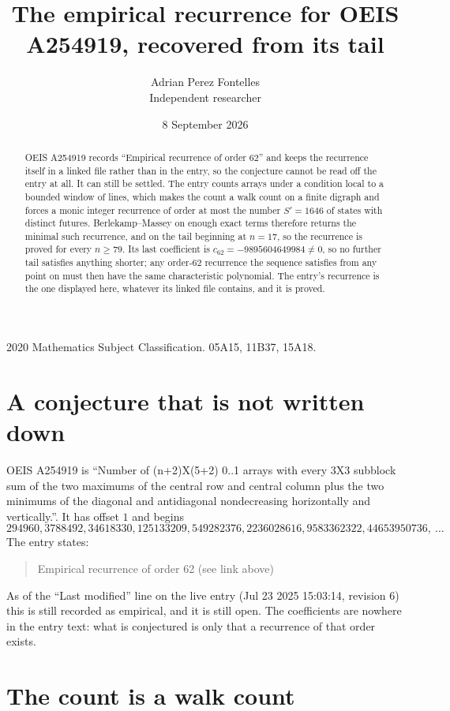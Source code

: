 \documentclass[11pt,a4paper]{article}
\title{The empirical recurrence for OEIS A254919, recovered from its tail}
\author{Adrian Perez Fontelles\\ \small Independent researcher}
\date{8 September 2026}
\theoremstyle{plain}
\theoremstyle{definition}
\begin{document}
\maketitle

\begin{abstract}
OEIS A254919 records ``Empirical recurrence of order $62$'' and keeps the recurrence itself in
a linked file rather than in the entry, so the conjecture cannot be read off the entry at all.
It can still be settled. The entry counts arrays under a condition local to a bounded window of
lines, which makes the count a walk count on a finite digraph and forces a monic integer
recurrence of order at most the number $S'=1646$ of states with distinct futures. Berlekamp--Massey on
enough exact terms therefore returns the minimal such recurrence, and on the tail beginning at $n=17$, so the recurrence is proved for every $n\ge79$.
Its last coefficient is $c_{62}=-9895604649984\neq0$, so no further tail satisfies anything
shorter; any order-$62$ recurrence the sequence satisfies from any point on must then have
the same characteristic polynomial. The entry's recurrence is the one displayed here, whatever
its linked file contains, and it is proved.
\end{abstract}

\noindent\small 2020 Mathematics Subject Classification. 05A15, 11B37, 15A18.\normalsize

\section{A conjecture that is not written down}

OEIS A254919 is ``Number of (n+2)X(5+2) 0..1 arrays with every 3X3 subblock sum of the two maximums of the central row and central column plus the two minimums of the diagonal and antidiagonal nondecreasing horizontally and vertically.''. It has offset $1$ and begins
\[
294960, 3788492, 34618330, 125133209, 549282376, 2236028616, 9583362322, 44653950736,\ \dots
\]
The entry states:
\begin{quote}
Empirical recurrence of order 62 (see link above)
\end{quote}
As of the ``Last modified'' line on the live entry (Jul 23 2025 15:03:14, revision 6)
this is still recorded as empirical, and it is still open. The coefficients are nowhere in the
entry text: what is conjectured is only that a recurrence of that order exists.

\section{The count is a walk count}
\end{document}

